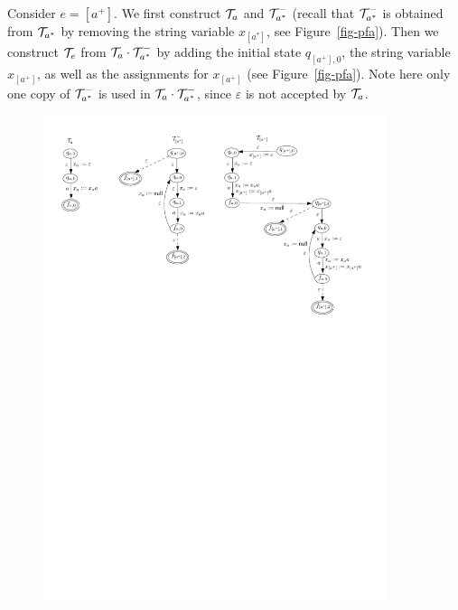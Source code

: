 \begin{example}\label{exmp-pfa}
Consider {\pcre} $e = [a^+]$. 
We first construct $\mathcal{T}_{a}$ and $\mathcal{T}^-_{a^*}$ (recall that $\mathcal{T}^-_{a^*}$ is obtained from $\mathcal{T}_{a^*}$ by removing the string variable $x_{[a^*]}$, see Figure~\ref{fig-pfa}).  Then we construct $\mathcal{T}_{e}$ from $\mathcal{T}_{a} \cdot \mathcal{T}^-_{a^*}$ by adding the initial state $q_{[a^+],0}$, the string variable $x_{[a^+]}$, as well as the assignments for $x_{[a^+]}$ (see Figure~\ref{fig-pfa}). Note here only one copy of $\mathcal{T}^-_{a^*}$ is used in $\mathcal{T}_{a} \cdot \mathcal{T}^-_{a^*}$, since $\varepsilon$ is not accepted by $\mathcal{T}_{a}$.
	\begin{figure}[tb]
		\centering
		\includegraphics[width=0.9\textwidth]{pfa-new.pdf}

\end{figure}
\end{example}
